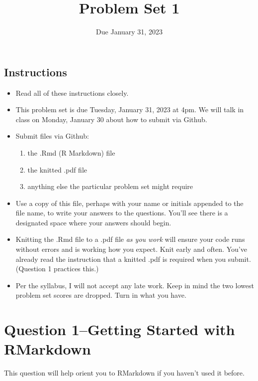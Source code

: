 \documentclass[
]{article}
\title{Problem Set 1}
\author{}
\date{\vspace{-2.5em}Due January 31, 2023}
\providecommand{\tightlist}{%
  \setlength{\itemsep}{0pt}\setlength{\parskip}{0pt}}
\begin{document}
\maketitle

\hypertarget{instructions}{%
\subsection{Instructions}\label{instructions}}

\begin{itemize}
\tightlist
\item
  Read all of these instructions closely.
\item
  This problem set is due Tuesday, January 31, 2023 at 4pm. We will talk
  in class on Monday, January 30 about how to submit via Github.
\item
  Submit files via Github:

  \begin{enumerate}
  \def\labelenumi{\arabic{enumi}.}
  \tightlist
  \item
    the .Rmd (R Markdown) file
  \item
    the knitted .pdf file
  \item
    anything else the particular problem set might require
  \end{enumerate}
\item
  Use a copy of this file, perhaps with your name or initials appended
  to the file name, to write your answers to the questions. You'll see
  there is a designated space where your answers should begin.
\item
  Knitting the .Rmd file to a .pdf file \emph{as you work} will ensure
  your code runs without errors and is working how you expect. Knit
  early and often. You've already read the instruction that a knitted
  .pdf is required when you submit. (Question 1 practices this.)
\item
  Per the syllabus, I will not accept any late work. Keep in mind the
  two lowest problem set scores are dropped. Turn in what you have.
\end{itemize}

\hypertarget{question-1getting-started-with-rmarkdown}{%
\section{Question 1--Getting Started with
RMarkdown}\label{question-1getting-started-with-rmarkdown}}

This question will help orient you to RMarkdown if you haven't used it
before.
\end{document}
